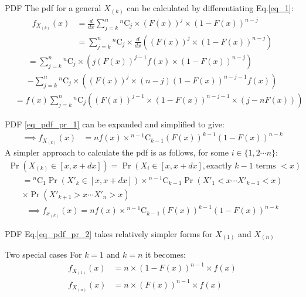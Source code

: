 \documentclass{beamer}
\newcommand{\comb}[2]{{}^{#1}\mathrm{C}_{#2}}
\providecommand{\brak}[1]{\ensuremath{\left(#1\right)}}
\providecommand{\pr}[1]{\ensuremath{\Pr\left(#1\right)}}
\begin{document}
\begin{frame}{PDF}
The pdf for a general $X_{(k)}$ can be calculated by differentiating Eq.\eqref{eq_1}:
\begin{align}
f_{X_{(k)}}(x) &= \frac{d}{dx}\sum_{j=k}^{n}\comb{n}{j}\times\brak{F(x)}^{j}\times\brak{1-F(x)}^{n-j}\\
&= \sum_{j=k}^{n  }\comb{n}{j}\times\frac{d}{dx}\brak{\brak{F(x)}^{j}\times\brak{1-F(x)}^{n-j}}
\end{align}
\begin{multline}
= \sum_{j=k}^{n}\comb{n}{j}\times\brak{j\brak{F(x)}^{j-1}f(x)\times\brak{1-F(x)}^{n-j}}\\
-\sum_{j=k}^{n}\comb{n}{j}\times\brak{\brak{F(x)}^{j}\times(n-j)\brak{1-F(x)}^{n-j-1}f(x)}
\end{multline}
\begin{align}
    &=f(x)\sum_{j=k}^{n}\comb{n}{j}\brak{\brak{F(x)}^{j-1}\times\brak{1-F(x)}^{n-j-1}\times\brak{j-nF\brak{x}}}\label{eq_pdf_pr_1}
\end{align}
\end{frame}
\begin{frame}{PDF}
\eqref{eq_pdf_pr_1} can be expanded and simplified to give:
    \begin{align}
        \implies f_{X_{(k)}}(x) &= nf(x)\times\comb{n-1}{k-1}\brak{F(x)}^{k-1}\brak{1-F(x)}^{n-k}
    \end{align}
    A simpler approach to calculate the pdf is as follows, for some $i\in\{1,2\cdots n\}$:
    \begin{align}
    \pr{X_{(k)}\in[x,x+dx]}=\pr{X_i\in[x,x+dx],\text{exactly $k-1$ terms $< x$}}\nonumber
    \end{align}
    \begin{multline}\nonumber
    =\comb{n}{1}\pr{X'_k\in[x,x+dx]}\times\comb{n-1}{k-1}\pr{X'_1<x\cdots X'_{k-1}<x}\\\times\pr{X'_{k+1}>x\cdots X'_n>x}
    \end{multline}
    \begin{align}
    \implies f_{x_{(k)}}(x)=nf(x)\times\comb{n-1}{k-1}\brak{F(x)}^{k-1}\brak{1-F(x)}^{n-k}\label{eq_pdf_pr_2}
    \end{align}
\end{frame}


\begin{frame}{PDF}
Eq.\eqref{eq_pdf_pr_2} takes relatively simpler forms for $X_{(1)}$ and $X_{(n)}$
\begin{block}{Two special cases}
For $k=1$ and $k=n$ it becomes:
\begin{align}
    f_{X_{(1)}}(x)&= n\times(1-F(x))^{n-1}\times f(x)\\
    f_{X_{(n)}}(x)&= n\times(F(x))^{n-1}\times f(x)
\end{align}
\end{block}
\end{frame}
\end{document}
